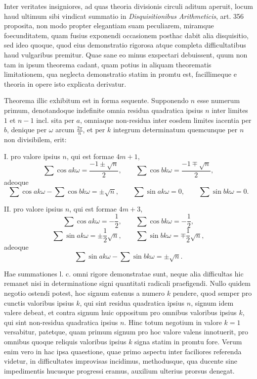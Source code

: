 \documentclass[12pt]{article}
\begin{document}
Inter veritates insigniores, ad quas theoria divisionis circuli aditum aperuit, locum haud ultimum sibi vindicat summatio in \emph{Disquisitionibus Arithmeticis}, art. 356 proposita, non modo propter elegantiam suam peculiarem, miramque foecunditatem, quam fusius exponendi occasionem posthac dabit alia disquisitio, sed ideo quoque, quod eius demonstratio rigorosa atque completa difficultatibus haud vulgaribus premitur. Quae sane eo minus exspectari debuissent, quum non tam in ipsum theorema cadant, quam potius in aliquam theorematis limitationem, qua neglecta demonstratio statim in promtu est, facillimeque e theoria in opere isto explicata derivatur.

Theorema illic exhibitum est in forma sequente. Supponendo $n$ esse numerum primum, denotandoque indefinite omnia residua quadratica ipsius $n$ inter limites $1$ et $n-1$ incl. sita per $a$, omniaque non-residua inter eosdem limites iacentia per $b$, denique per $\omega$ arcum $\frac{2\pi}{n}$, et per $k$ integrum determinatum quemcunque per $n$ non divisibilem, erit:

I. pro valore ipsius $n$, qui est formae $4m+1$,
\[
\sum \cos ak\omega=\frac{-1\pm\sqrt n}{2},\qquad
\sum \cos bk\omega=\frac{-1\mp\sqrt n}{2},
\]
adeoque
\[
\sum \cos ak\omega-\sum \cos bk\omega=\pm\sqrt n,\qquad
\sum \sin ak\omega=0,\qquad \sum \sin bk\omega=0.
\]

II. pro valore ipsius $n$, qui est formae $4m+3$,
\[
\sum \cos ak\omega=-\frac12,\qquad
\sum \cos bk\omega=-\frac12,
\]
\[
\sum \sin ak\omega=\pm\frac12\sqrt n,\qquad
\sum \sin bk\omega=\mp\frac12\sqrt n,
\]
adeoque
\[
\sum \sin ak\omega-\sum \sin bk\omega=\pm\sqrt n.
\]

Hae summationes l. c. omni rigore demonstratae sunt, neque alia difficultas hic remanet nisi in determinatione signi quantitati radicali praefigendi. Nullo quidem negotio ostendi potest, hoc signum eatenus a numero $k$ pendere, quod semper pro cunctis valoribus ipsius $k$, qui sint residua quadratica ipsius $n$, signum idem valere debeat, et contra signum huic oppositum pro omnibus valoribus ipsius $k$, qui sint non-residua quadratica ipsius $n$. Hinc totum negotium in valore $k=1$ versabitur, patetque, quam primum signum pro hoc valore valens innotuerit, pro omnibus quoque reliquis valoribus ipsius $k$ signa statim in promtu fore. Verum enim vero in hac ipsa quaestione, quae primo aspectu inter faciliores referenda videtur, in difficultates improvisas incidimus, methodusque, qua ducente sine impedimentis hucusque progressi eramus, auxilium ulterius prorsus denegat.
\end{document}

